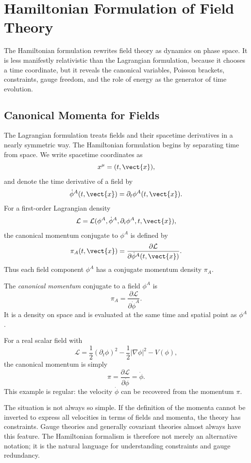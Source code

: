 \chapter{Hamiltonian Formulation of Field Theory}

\begin{remarkbox}
The Hamiltonian formulation rewrites field theory as dynamics on phase space.
It is less manifestly relativistic than the Lagrangian formulation, because it
chooses a time coordinate, but it reveals the canonical variables, Poisson
brackets, constraints, gauge freedom, and the role of energy as the generator of
time evolution.
\end{remarkbox}

\section{Canonical Momenta for Fields}

The Lagrangian formulation treats fields and their spacetime derivatives in a
nearly symmetric way. The Hamiltonian formulation begins by separating time from
space. We write spacetime coordinates as
\[
    x^\mu=(t,\vect{x}),
\]
and denote the time derivative of a field by
\[
    \dot{\phi}^A(t,\vect{x})=\partial_t\phi^A(t,\vect{x}).
\]
For a first-order Lagrangian density
\[
    \mathcal{L}=\mathcal{L}(\phi^A,\dot{\phi}^A,\partial_i\phi^A,t,\vect{x}),
\]
the canonical momentum conjugate to \(\phi^A\) is defined by
\[
    \pi_A(t,\vect{x})
    =\frac{\partial\mathcal{L}}{\partial\dot{\phi}^A(t,\vect{x})}.
\]
Thus each field component \(\phi^A\) has a conjugate momentum density
\(\pi_A\).

\begin{definitionbox}
The \emph{canonical momentum} conjugate to a field \(\phi^A\) is
\[
    \pi_A=\frac{\partial\mathcal{L}}{\partial\dot{\phi}^A}.
\]
It is a density on space and is evaluated at the same time and spatial point as
\(\phi^A\).
\end{definitionbox}

For a real scalar field with
\[
    \mathcal{L}
    =\frac{1}{2}(\partial_t\phi)^2
     -\frac{1}{2}|\nabla\phi|^2
     -V(\phi),
\]
the canonical momentum is simply
\[
    \pi=\frac{\partial\mathcal{L}}{\partial\dot\phi}=\dot\phi.
\]
This example is regular: the velocity \(\dot\phi\) can be recovered from the
momentum \(\pi\).

The situation is not always so simple. If the definition of the momenta cannot
be inverted to express all velocities in terms of fields and momenta, the theory
has constraints. Gauge theories and generally covariant theories almost always
have this feature. The Hamiltonian formalism is therefore not merely an
alternative notation; it is the natural language for understanding constraints
and gauge redundancy.

